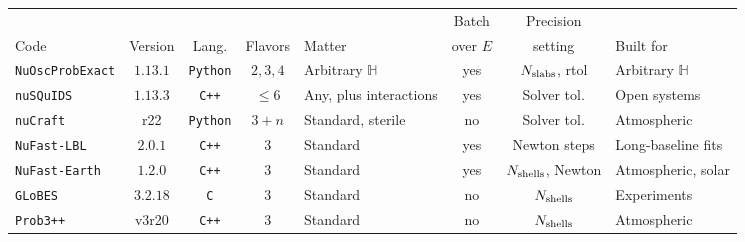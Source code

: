 \documentclass[final,5p,times,twocolumn,sort,compress]{elsarticle}
\begin{document}
{\def\arraystretch{1.2}\setlength{\tabcolsep}{4pt}
\begin{table}[t!]
\centering
\begin{tabular}{l c c c >{\raggedright\arraybackslash}p{3.2cm} c c >{\raggedright\arraybackslash}p{3.0cm}}
 \hline\hline
 & & & & & Batch & Precision & \\
 Code & Version & Lang. & Flavors & Matter & over $E$ & setting & Built for \\
 \hline
 {\tt NuOscProbExact}
   & $1.13.1$ & {\tt Python} & $2,3,4$ & Arbitrary $\mathbb{H}$ & yes
   & $N_{\rm slabs}$, rtol & Arbitrary $\mathbb{H}$ \\
 {\tt nuSQuIDS}\ \cite{Delgado:2014kpa, NuSQuIDS}
   & $1.13.3$ & {\tt C++} & $\leq 6$ & Any, plus interactions & yes & Solver tol.
   & Open systems \\
 {\tt nuCraft}\ \cite{nuCraft}
   & r22 & {\tt Python} & $3+n$ & Standard, sterile & no\rlap{$^{\ddagger}$}
   & Solver tol. & Atmospheric \\
 {\tt NuFast-LBL}\ \cite{Denton:2024pzc}
   & $2.0.1$ & {\tt C++} & $3$ & Standard & yes & Newton steps
   & Long-baseline fits \\
 {\tt NuFast-Earth}\ \cite{Denton:2025oxf}
   & $1.2.0$ & {\tt C++} & $3$ & Standard & yes & $N_{\rm shells}$, Newton
   & Atmospheric, solar \\
 {\tt GLoBES}\ \cite{GLoBES}
   & $3.2.18$ & {\tt C} & $3$\rlap{$^{\dagger}$} & Standard & no
   & $N_{\rm shells}$ & Experiments \\
 {\tt Prob3++}\ \cite{Prob3pp}
   & v3r20 & {\tt C++} & $3$ & Standard & no & $N_{\rm shells}$
   & Atmospheric \\
 \hline\hline
\end{tabular}

\end{table}}
\end{document}
